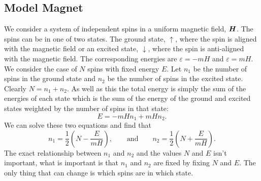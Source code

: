 \documentclass[a4paper]{article}
\begin{document}
    \subsection{Model Magnet}
    We consider a system of independent spins in a uniform magnetic field, \(\bm{H}\).
    The spins can be in one of two states.
    The ground state, \(\uparrow\), where the spin is aligned with the magnetic field or an excited state, \(\downarrow\), where the spin is anti-aligned with the magnetic field.
    The corresponding energies are \(\varepsilon = -mH\) and \(\varepsilon = mH\).
    We consider the case of \(N\) spins with fixed energy \(E\).
    Let \(n_1\) be the number of spins in the ground state and \(n_2\) be the number of spins in the excited state.
    Clearly \(N = n_1 + n_2\).
    As well as this the total energy is simply the sum of the energies of each state which is the sum of the energy of the ground and excited states weighted by the number of spins in that state:
    \[E = -mHn_1 + mHn_2.\]
    We can solve these two equations and find that
    \[n_1 = \frac{1}{2}\left(N - \frac{E}{mH}\right), \qquad\text{and}\qquad n_2 = \frac{1}{2}\left(N + \frac{E}{mH}\right).\]
    The exact relationship between \(n_1\) and \(n_2\) and the values \(N\) and \(E\) isn't important, what is important is that \(n_1\) and \(n_2\) are fixed by fixing \(N\) and \(E\).
    The only thing that can change is which spins are in which state.
    
\end{document}
